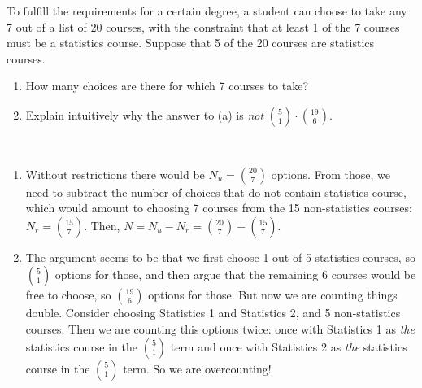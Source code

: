 
\setcounter{theorem}{7}

\begin{exercise}[BH.1.10]
	To fulfill the requirements for a certain degree, a student can choose to take any 7 out of a list of 20 courses, with the constraint that at least 1 of the 7 courses must be a statistics course. Suppose that 5 of the 20 courses are statistics courses.
	\begin{enumerate}
		\item How many choices are there for which 7 courses to take?
		\item Explain intuitively why the answer to (a) is \emph{not} $\binom{5}{1} \cdot \binom{19}{6}$.
	\end{enumerate}
\begin{solution}~
	 \begin{enumerate}
	 	\item Without restrictions there would be $N_{u}={20\choose 7}$ options. From those, we need to subtract the number of choices that do not contain statistics course, which would amount to choosing 7 courses from the 15 non-statistics courses: $N_{r} = {15\choose 7}$. Then, $N=N_{u}-N_{r}={20\choose 7}-{15 \choose 7}$.
		\item The argument seems to be that we first choose 1 out of 5 statistics courses, so ${5 \choose 1}$ options for those, and then argue that the remaining 6 courses would be free to choose, so ${19 \choose 6}$ options for those. But now we are counting things double. Consider choosing Statistics 1 and Statistics 2, and 5 non-statistics courses. Then we are counting this options twice: once with Statistics 1 as \textit{the} statistics course in the ${5 \choose 1}$ term and once with Statistics 2 as \textit{the} statistics course in the ${5 \choose 1}$ term. So we are overcounting!
	 \end{enumerate}
\end{solution}
\end{exercise}

